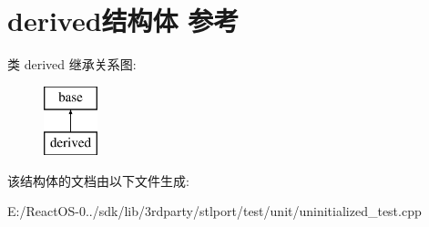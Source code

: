 \hypertarget{structderived}{}\section{derived结构体 参考}
\label{structderived}
类 derived 继承关系图\+:\begin{figure}[H]
\begin{center}
\leavevmode
\includegraphics[height=2.000000cm]{structderived}
\end{center}
\end{figure}


该结构体的文档由以下文件生成\+:\begin{DoxyCompactItemize}
\item 
E\+:/\+React\+O\+S-\/0../sdk/lib/3rdparty/stlport/test/unit/uninitialized\+\_\+test.\+cpp\end{DoxyCompactItemize}
